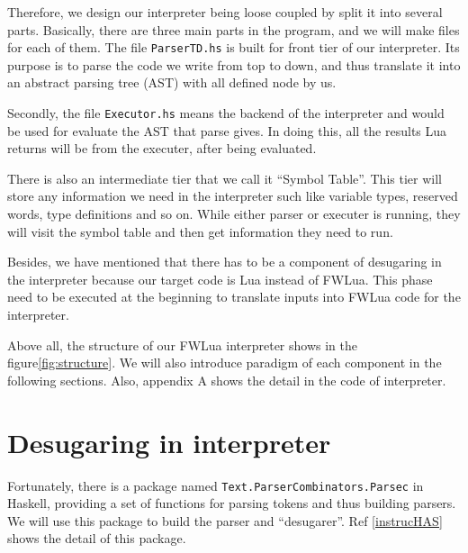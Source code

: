 Therefore, we design our interpreter being loose coupled by split it into several parts. Basically, there are three main parts in the program, and we will make files for each of them. The file {\tt ParserTD.hs} is built for front tier of our interpreter. Its purpose is to parse the code we write from top to down, and thus translate it into an abstract parsing tree (AST) with all defined node by us. 

Secondly, the file {\tt Executor.hs} means the backend of the interpreter and would be used for evaluate the AST that parse gives. In doing this, all the results Lua returns will be from the executer, after being evaluated. 

There is also an intermediate tier that we call it ``Symbol Table''. This tier will store any information we need in the interpreter such like variable types, reserved words, type definitions and so on. While either parser or executer is running, they will visit the symbol table and then get information they need to run. 

Besides, we have mentioned that there has to be a component of desugaring in the interpreter because our target code is Lua instead of FWLua. This phase need to be executed at the beginning to translate inputs into FWLua code for the interpreter. 

Above all, the structure of our FWLua interpreter shows in the figure\ref {fig:structure}. We will also introduce paradigm of each component in the following sections. Also, appendix A shows the detail in the code of interpreter.

\section{Desugaring in interpreter}
Fortunately, there is a package named {\tt Text.ParserCombinators.Parsec} in Haskell, providing a set of functions for parsing tokens and thus building parsers. We will use this package to build the parser and ``desugarer''. Ref \ref{instrucHAS} shows the detail of this package.

